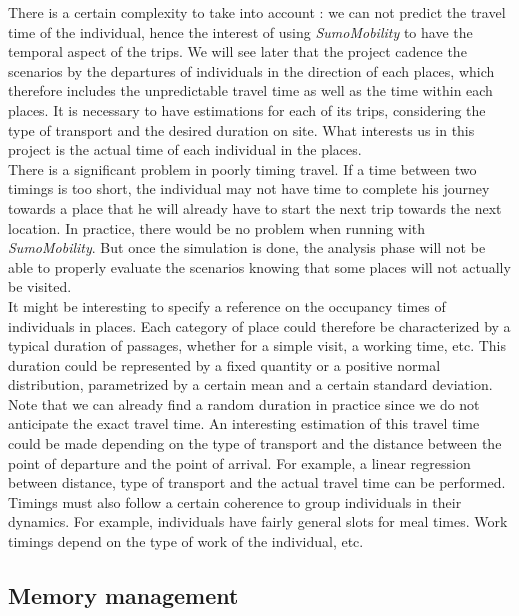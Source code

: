 There is a certain complexity to take into account : we can not predict the travel time of the individual, hence the interest of using \textit{SumoMobility} to have the temporal aspect of the trips. We will see later that the project cadence the scenarios by the departures of individuals in the direction of each places, which therefore includes the unpredictable travel time as well as the time within each places. It is necessary to have estimations for each of its trips, considering the type of transport and the desired duration on site. What interests us in this project is the actual time of each individual in the places.\\

There is a significant problem in poorly timing travel. If a time between two timings is too short, the individual may not have time to complete his journey towards a place that he will already have to start the next trip towards the next location. In practice, there would be no problem when running with \textit{SumoMobility}. But once the simulation is done, the analysis phase will not be able to properly evaluate the scenarios knowing that some places will not actually be visited.\\

It might be interesting to specify a reference on the occupancy times of individuals in places. Each category of place could therefore be characterized by a typical duration of passages, whether for a simple visit, a working time, etc. This duration could be represented by a fixed quantity or a positive normal distribution, parametrized by a certain mean and a certain standard deviation. Note that we can already find a random duration in practice since we do not anticipate the exact travel time. An interesting estimation of this travel time could be made depending on the type of transport and the distance between the point of departure and the point of arrival. For example, a linear regression between distance, type of transport and the actual travel time can be performed.\\

Timings must also follow a certain coherence to group individuals in their dynamics. For example, individuals have fairly general slots for meal times. Work timings depend on the type of work of the individual, etc.\\

\subsection{Memory management}

